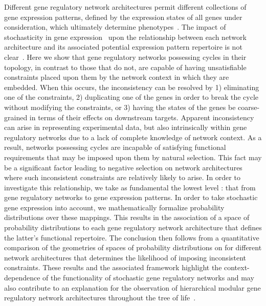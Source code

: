 Different gene regulatory network architectures permit different collections of gene expression patterns, defined by the expression states of all genes under consideration, which ultimately determine phenotypes~\cite{Alon2007,Milo2004}. The impact of stochasticity in gene expression~\cite{Eldar2010,Sanchez2013} upon the relationship between each network architecture and its associated potential expression pattern repertoire is not clear~\cite{Jothi2009,Golding2005,Lestas2010,Hilfinger2012,Chalancon2012}. Here we show that gene regulatory networks possessing cycles in their topology, in contrast to those that do not, are capable of having unsatisfiable constraints placed upon them by the network context in which they are embedded. When this occurs, the inconsistency can be resolved by 1) eliminating one of the constraints, 2) duplicating one of the genes in order to break the cycle without modifying the constraints, or 3) having the states of the genes be coarse-grained in terms of their effects on downstream targets. Apparent inconsistency can arise in representing experimental data, but also intrinsically within gene regulatory networks due to a lack of complete knowledge of network context. As a result, networks possessing cycles are incapable of satisfying functional requirements that may be imposed upon them by natural selection. This fact may be a significant factor leading to negative selection on network architectures where such inconsistent constraints are relatively likely to arise. In order to investigate this relationship, we take as fundamental the lowest level \gnpm{}: that from gene regulatory networks to gene expression patterns. In order to take stochastic gene expression into account, we mathematically formalize probability distributions over these mappings. This results in the association of a space of probability distributions to each gene regulatory network architecture that defines the latter's functional repertoire. The conclusion then follows from a quantitative comparison of the geometries of spaces of probability distributions on \gnpm{} for different network architectures that determines the likelihood of imposing inconsistent constraints. These results and the associated framework highlight the context-dependence of the functionality of stochastic gene regulatory networks and may also contribute to an explanation for the observation of hierarchical modular gene regulatory network architectures throughout the tree of life~\cite{Ravasz2002,Segre2005,Wagner2007,Erwin2009,Jothi2009,Bhardwaj2010,Colm}.

